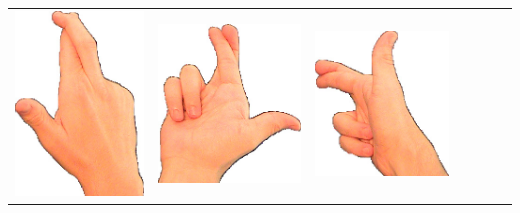 \documentclass{article}
\begin{document}
\begin{center}
\begin{tabular}{r*{6}{c}}
\includegraphics[scale=0.1]{images/03-09-3.jpg}&
\includegraphics[scale=0.1]{images/03-09-4.jpg}&
\includegraphics[scale=0.1]{images/03-09-5.jpg}&

\end{tabular}
\end{center}
\end{document}
